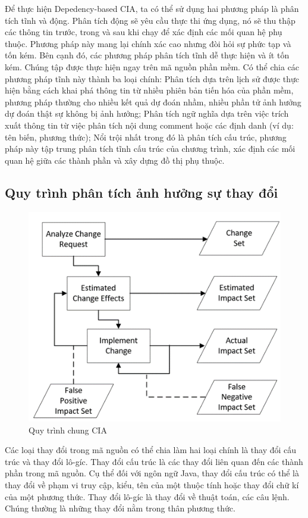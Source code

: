 \documentclass[12pt]{report}
\begin{document}
Để thực hiện Depedency-based CIA, ta có thể sử dụng hai phương pháp là phân tích tĩnh và động. Phân tích động sẽ yêu cầu thực thi ứng dụng, nó sẽ thu thập các thông tin trước, trong và sau khi chạy để xác định các mối quan hệ phụ thuộc. Phương pháp này mang lại chính xác cao nhưng đòi hỏi sự phức tạp và tốn kém. Bên cạnh đó, các phương pháp phân tích tĩnh dễ thực hiện và ít tốn kém. Chúng tập được thực hiện ngay trên mã nguồn phần mềm. Có thể chia các phương pháp tĩnh này thành ba loại chính: Phân tích dựa trên lịch sử được thực hiện bằng cách khai phá thông tin từ nhiều phiên bản tiến hóa của phần mềm, phương pháp thường cho nhiều kết quả dự đoán nhầm, nhiều phần tử ảnh hưởng dự đoán thật sự không bị ảnh hưởng; Phân tích ngữ nghĩa dựa trên việc trích xuất thông tin từ việc phân tích nội dung comment hoặc các định danh (ví dụ: tên biến, phương thức); Nổi trội nhất trong đó là phân tích cấu trúc, phương pháp này tập trung phân tích tĩnh cấu trúc của chương trình, xác định các mối quan hệ giữa các thành phần và xây dựng đồ thị phụ thuộc.

\subsection{Quy trình phân tích ảnh hưởng sự thay đổi}
\begin{figure}[h]
	\centering
	\includegraphics[scale=0.8]{CIA-process}
	\caption{Quy trình chung CIA}
	\label{fig:cia-process}
\end{figure}

Các loại thay đổi trong mã nguồn có thể chia làm hai loại chính là thay đổi cấu trúc và thay đổi lô-gíc. Thay đổi cấu trúc là các thay đổi liên quan đến các thành phần trong mã nguồn. Cụ thể đối với ngôn ngữ Java, thay đổi cấu trúc có thể là thay đổi về phạm vi truy cập, kiểu, tên của một thuộc tính hoặc thay đổi chữ kí của một phương thức. Thay đổi lô-gíc là thay đổi về thuật toán, các câu lệnh. Chúng thường là những thay đổi nằm trong thân phương thức.
\end{document}
